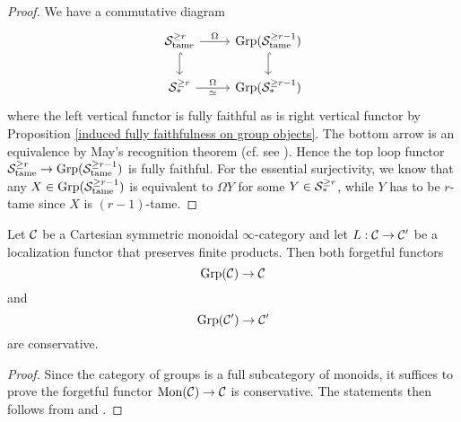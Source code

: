 \begin{proof}
	We have a commutative diagram 
	\[
	\begin{tikzcd}
		\CS^{\geq r}_{\tame} & \Grp(\CS^{\geq r-1}_{\tame})\\
		\CS^{\geq r}_*   &  \Grp(\CS^{\geq r-1}_{*})  	
	\arrow[from=1-1, to=1-2,"\Omega"]
	\arrow[from=2-1, to=2-2, "\Omega","\simeq" below]
	\arrow[hook, from=1-1, to=2-1]
	\arrow[hook, from=1-2, to=2-2]
	\end{tikzcd}
	\]
	where the left vertical functor is fully faithful as is right vertical functor by Proposition \ref{induced fully faithfulness on group objects}. The bottom arrow is an equivalence by May's recognition theorem (cf. see \cite[Theorem 5.2.6.10.]{HA}). Hence the top loop functor ${\mathcal{S}}^{\geq r}_{\operatorname{\operatorname{tame}}} \to \operatorname{Grp}({\mathcal{S}}^{\geq r-1}_{\operatorname{\operatorname{tame}}})$ is fully faithful.
	For the essential surjectivity, we know that any $X\in \operatorname{Grp}({\mathcal{S}}^{\geq r-1}_{\operatorname{\operatorname{tame}}})$ is equivalent to $\Omega Y$ for some $Y\in {\mathcal{S}}^{\geq r}_*$, while $Y$ has to be $r$-tame since $X$ is $(r-1)$-tame.
	
\end{proof}

\begin{lemma}
\label{conservativity of forgetful functor (general)}
	Let ${\mathcal{C}}$ be a Cartesian symmetric monoidal $\infty$-category and let $L:{\mathcal{C}}\to {\mathcal{C}}'$ be a localization functor that preserves finite products.
	Then both forgetful functors 
	\[
	\operatorname{Grp}({\mathcal{C}})\to {\mathcal{C}}
	\]
	and 
	\[
	\operatorname{Grp}({\mathcal{C}}')\to {\mathcal{C}}'
	\]
	are conservative.
\end{lemma}
\begin{proof}
	Since the category of groups is a full subcategory of monoids, it suffices to prove the forgetful functor $\operatorname{Mon}({\mathcal{C}})\to {\mathcal{C}}$ is conservative.
	The statements then follows from \cite[Proposition 2.4.2.5]{HA} and \cite[Lemma 3.2.2.6.]{HA}.
	
\end{proof}

